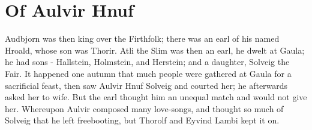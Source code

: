 \chapter{Of Aulvir Hnuf}
Audbjorn was then king over the Firthfolk; there was an earl of his named Hroald, whose son was Thorir. Atli the Slim was then an earl, he dwelt at Gaula; he had sons - Hallstein, Holmstein, and Herstein; and a daughter, Solveig the Fair. It happened one autumn that much people were gathered at Gaula for a sacrificial feast, then saw Aulvir Hnuf Solveig and courted her; he afterwards asked her to wife. But the earl thought him an unequal match and would not give her. Whereupon Aulvir composed many love-songs, and thought so much of Solveig that he left freebooting, but Thorolf and Eyvind Lambi kept it on.
